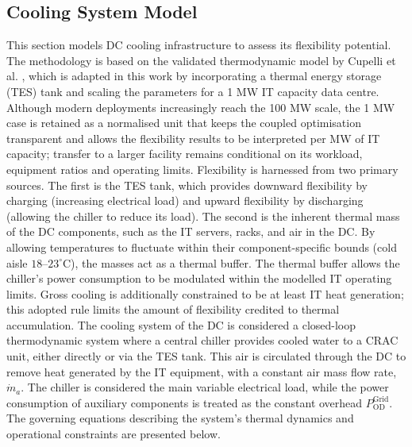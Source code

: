 \documentclass[lettersize,journal]{IEEEtran}
\newcommand{\rev}[1]{#1}
\begin{document}
\subsection{Cooling System Model} \label{sec: Cooling Infrastructure Flexibility} 
This section models DC cooling infrastructure to assess its flexibility potential. The methodology is based on the validated thermodynamic model by Cupelli et al. \cite{cupelli2018data}, which is adapted in this work by incorporating a thermal energy storage (TES) tank and scaling the parameters for a 1 MW IT capacity data centre. \rev{Although modern deployments increasingly reach the 100 MW scale, the 1 MW case is retained as a normalised unit that keeps the coupled optimisation transparent and allows the flexibility results to be interpreted per MW of IT capacity; transfer to a larger facility remains conditional on its workload, equipment ratios and operating limits.}
Flexibility is harnessed from two primary sources. The first is the TES tank, which provides downward flexibility by charging (increasing electrical load) and upward flexibility by discharging (allowing the chiller to reduce its load). The second is the inherent thermal mass of the DC components, such as the IT servers, racks, and air in the DC. By allowing temperatures to fluctuate within their component-specific bounds (cold aisle $18$--$23^\circ$C), the masses act as a thermal buffer. The thermal buffer allows the chiller's power consumption to be modulated within the modelled IT operating limits. Gross cooling is additionally constrained to be at least IT heat generation; this adopted rule limits the amount of flexibility credited to thermal accumulation.
The cooling system of the DC is considered a closed-loop thermodynamic system where a central chiller provides cooled water to a CRAC unit, either directly or via the TES tank. This air is circulated through the DC to remove heat generated by the IT equipment, with a constant air mass flow rate, $\dot{m}_{a}$. The chiller is considered the main variable electrical load, while the power consumption of auxiliary components is treated as \rev{the constant overhead $P^{\mathrm{Grid}}_{\mathrm{OD}}$}. The governing equations describing the system's thermal dynamics and operational constraints are presented below.
\end{document}
